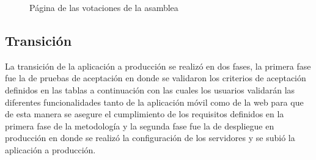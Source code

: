 \begin{figure}[H]
    \centering
    \caption{Página de las votaciones de la asamblea}
    \label{fig:api-vote}
\end{figure}

\subsection{Transición}\label{subsec:transicion}

La transición de la aplicación a producción se realizó en dos fases, la primera fase fue la de pruebas de aceptación en donde se validaron los criterios de aceptación definidos en las tablas a continuación con las cuales los usuarios validarán las diferentes funcionalidades tanto de la aplicación móvil como de la web para que de esta manera se asegure el cumplimiento de los requisitos definidos en la primera fase de la metodología y la segunda fase fue la de despliegue en producción en donde se realizó la configuración de los servidores y se subió la aplicación a producción.

